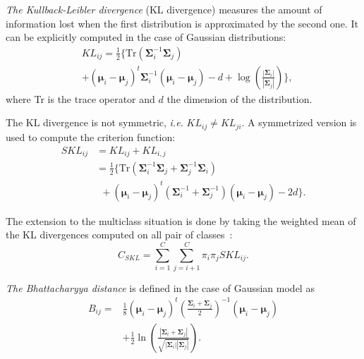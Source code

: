 \documentclass[journal]{IEEEtran}
\begin{document}
        \emph{The   Kullback-Leibler   divergence}   (KL   divergence)
        measures  the  amount  of  information  lost  when  the  first
        distribution     is     approximated     by     the     second
        one\cite{kullback1987letter}. It can be explicitly computed in
        the case of Gaussian distributions:
        \begin{align}
            &KL_{ij} = \frac{1}{2} \biggl\{ \text{Tr} (\boldsymbol{\Sigma}_i^{-1} \boldsymbol{\Sigma}_j) \nonumber \\
            & + (\boldsymbol{\mu}_i - \boldsymbol{\mu}_j)^t \boldsymbol{\Sigma}_i^{-1} (\boldsymbol{\mu}_i - \boldsymbol{\mu}_j) - d + \log \left( \frac{|\boldsymbol{\Sigma}_i|}{|\boldsymbol{\Sigma}_j|} \right) \biggr\},
        \end{align}
        where Tr is the trace operator and $d$ the dimension of the distribution.

        The    KL   divergence    is   not    symmetric,   \emph{i.e.}
        $KL_{ij} \ne KL_{ji}$.  A symmetrized version  is used to
        compute the criterion function:
        \begin{align}\label{eq:skl}
          SKL_{ij} &=KL_{ij} + KL_{i,j} \nonumber \\
            &= \frac{1}{2} \biggl\{ \text{Tr} (\boldsymbol{\Sigma}_i^{-1} \boldsymbol{\Sigma}_j + \boldsymbol{\Sigma}_j^{-1} \boldsymbol{\Sigma}_i) \nonumber \\
            &~~+ (\boldsymbol{\mu}_i - \boldsymbol{\mu}_j)^t (\boldsymbol{\Sigma}_i^{-1} + \boldsymbol{\Sigma}_j^{-1}) (\boldsymbol{\mu}_i - \boldsymbol{\mu}_j) - 2d \biggr\}.
        \end{align}

        The extension  to the multiclass  situation is done  by taking
        the weighted mean  of the KL divergences computed  on all pair
        of classes~\cite{bruzzone1995extension}:
        \begin{equation}
            C_{SKL} = \sum_{i=1}^{C} \sum_{j=i + 1}^{C} \pi_i \pi_j SKL_{ij}.
        \end{equation}

        \emph{The Bhattacharyya distance} is defined in the case of Gaussian model as
        \begin{align}
            {B}_{ij} = &\frac{1}{8} (\boldsymbol{\mu}_i - \boldsymbol{\mu}_j)^t \left( \frac{\boldsymbol{\Sigma}_i + \boldsymbol{\Sigma}_j}{2} \right)^{-1} (\boldsymbol{\mu}_i - \boldsymbol{\mu}_j) \nonumber \\
            &+ \frac{1}{2} \ln \left( \frac{|\boldsymbol{\Sigma}_i + \boldsymbol{\Sigma}_j|}{\sqrt{|\boldsymbol{\Sigma}_i| |\boldsymbol{\Sigma}_j|}} \right).
        \end{align}
\end{document}
